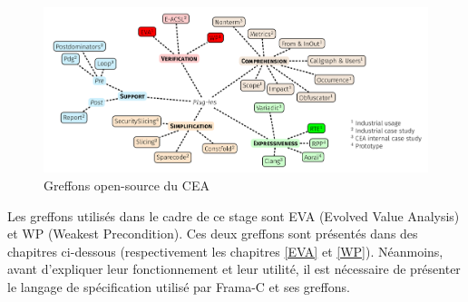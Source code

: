 \begin{figure}[!h]
\centering
\includegraphics[width=16cm]{images/greffons_frama2.png}
\caption{Greffons open-source du CEA}
\label{Greffons open-source du CEA}
\end{figure}

\newpage

Les greffons utilisés dans le cadre de ce stage sont EVA (Evolved Value Analysis) et WP (Weakest Precondition). Ces deux greffons sont présentés dans des chapitres ci-dessous (respectivement les chapitres \ref{EVA} et \ref{WP}). Néanmoins, avant d'expliquer leur fonctionnement et leur utilité, il est nécessaire de présenter le langage de spécification utilisé par Frama-C et ses greffons.







